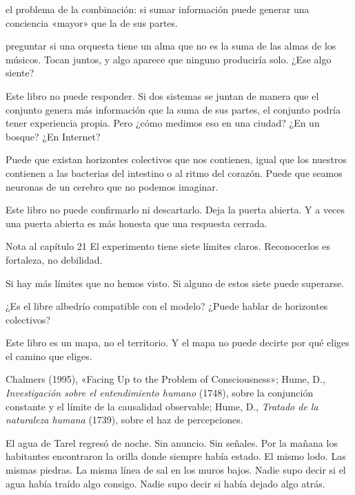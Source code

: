 \begin{fisica}
 el problema de la combinación: si sumar información puede generar una conciencia «mayor» que la de sus partes.

 preguntar si una orquesta tiene un alma que no es la suma de las almas de los músicos. Tocan juntos, y algo aparece que ninguno produciría solo. ¿Ese algo siente?
\end{fisica}
Este libro no puede responder. Si dos sistemas se juntan de manera que el conjunto genera más información que la suma de sus partes, el conjunto podría tener experiencia propia. Pero ¿cómo medimos eso en una ciudad? ¿En un bosque? ¿En Internet?

Puede que existan horizontes colectivos que nos contienen, igual que los nuestros contienen a las bacterias del intestino o al ritmo del corazón. Puede que seamos neuronas de un cerebro que no podemos imaginar.

Este libro no puede confirmarlo ni descartarlo. Deja la puerta abierta. Y a veces una puerta abierta es más honesta que una respuesta cerrada.

\begin{notacap}{Nota al capítulo 21}
 El experimento tiene siete límites claros. Reconocerlos es fortaleza, no debilidad.

 Si hay más límites que no hemos visto. Si alguno de estos siete puede superarse.

 ¿Es el libre albedrío compatible con el modelo? ¿Puede hablar de horizontes colectivos?

 Este libro es un mapa, no el territorio. Y el mapa no puede decirte por qué eliges el camino que eliges.

 Chalmers (1995), «Facing Up to the Problem of Consciousness»; Hume, D., \emph{Investigación sobre el entendimiento humano} (1748), sobre la conjunción constante y el límite de la causalidad observable; Hume, D., \emph{Tratado de la naturaleza humana} (1739), sobre el haz de percepciones.
\end{notacap}
\begin{cita}
El agua de Tarel regresó de noche. Sin anuncio. Sin señales. Por la mañana los habitantes encontraron la orilla donde siempre había estado. El mismo lodo. Las mismas piedras. La misma línea de sal en los muros bajos. Nadie supo decir si el agua había traído algo consigo. Nadie supo decir si había dejado algo atrás.
\end{cita}
\noindent {}

